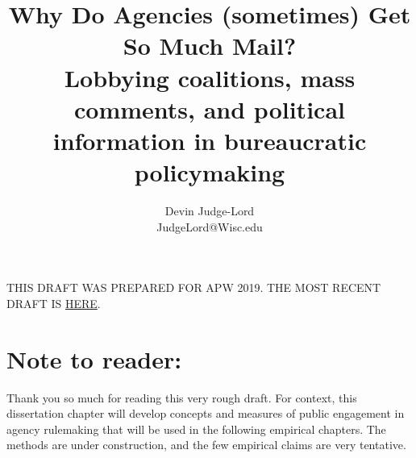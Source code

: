 \documentclass{article}
\title{Why Do Agencies (sometimes) Get So Much Mail? \\
Lobbying coalitions, mass comments, and political information in bureaucratic policymaking}
\author{Devin Judge-Lord \\ JudgeLord@Wisc.edu}
\begin{document}
\maketitle

\centering THIS DRAFT WAS PREPARED FOR APW 2019. THE MOST RECENT DRAFT IS \href{https://github.com/judgelord/dissertation/raw/master/whyMail.pdf}{HERE}.

\abstract{}


\newpage

\newpage
\section*{Note to reader:}
Thank you so much for reading this very rough draft. For context, this dissertation chapter will develop concepts and measures of public engagement in agency rulemaking that will be used in the following empirical chapters. The methods are under construction, and the few empirical claims are very tentative.



\doublespace
% 
\end{document}
